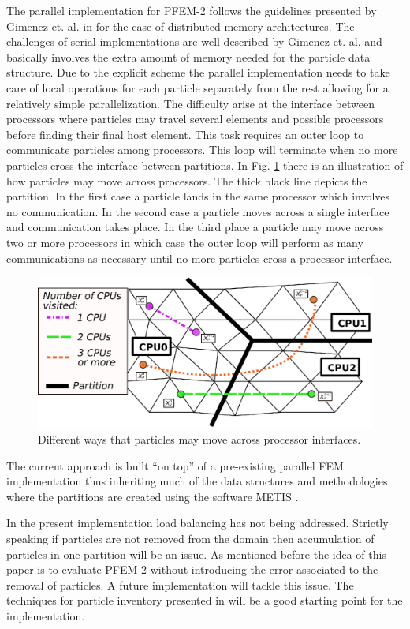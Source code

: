 The parallel implementation for PFEM-2 follows the guidelines presented by Gimenez et. al. in \cite{gimenez:parallel} for the case of distributed memory architectures. The challenges of serial implementations are well described by Gimenez et. al. and basically involves the extra amount of memory needed for the particle data structure. Due to the explicit scheme the parallel implementation needs to take care of local operations for each particle separately from the rest allowing for a relatively simple parallelization. The difficulty arise at the interface between processors where particles may travel several elements and possible processors before finding their final host element. This task requires an outer loop to communicate particles among processors. This loop will terminate when no more particles cross the interface between partitions. In Fig. \ref{fig:parallel} there is an illustration of how particles may move across processors. The thick black line depicts the partition. In the first case a particle lands in the same processor which involves no communication. In the second case a particle moves across a single interface and communication takes place. In the third place a particle may move across two or more processors in which case the outer loop will perform as many communications as necessary until no more particles cross a processor interface.
%
\begin{figure}[htp] 
\centering 
\includegraphics[scale=.6]{./imgs/parallel.eps}
\caption{Different ways that particles may move across processor interfaces.}
\label{fig:parallel}
\end{figure}
%
The current approach is built ``on top'' of a pre-existing parallel FEM implementation thus inheriting much of the data structures and methodologies where the partitions are created using the software METIS \cite{metis1,metis}.

In the present implementation load balancing has not being addressed. Strictly speaking if particles are not removed from the domain then accumulation of particles in one partition will be an issue. As mentioned before the idea of this paper is to evaluate PFEM-2 without introducing the error associated to the removal of particles. A future implementation will tackle this issue. The techniques for particle inventory presented in \cite{gimenez-difusion} will be a good starting point for the implementation.

